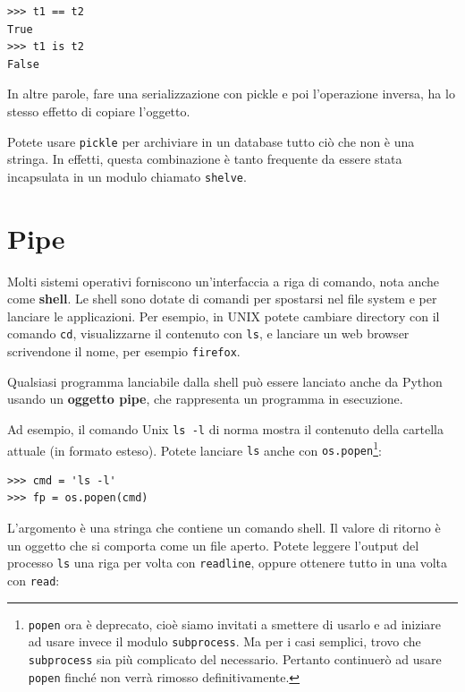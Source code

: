 \documentclass[10pt]{book}
\begin{document}
\begin{verbatim}
>>> t1 == t2
True
>>> t1 is t2
False
\end{verbatim}
%
In altre parole, fare una serializzazione con pickle e poi l'operazione inversa, ha lo stesso effetto di copiare l'oggetto.

Potete usare {\tt pickle} per archiviare in un database tutto ciò che non è una stringa. In effetti, questa combinazione è tanto frequente da essere stata incapsulata in un modulo chiamato {\tt shelve}.  


\section{Pipe}

Molti sistemi operativi forniscono un'interfaccia a riga di comando, nota anche come {\bf shell}.  Le shell sono dotate di comandi per spostarsi nel file system e per lanciare le applicazioni. Per esempio, in UNIX potete cambiare directory con il comando {\tt cd},
visualizzarne il contenuto con {\tt ls}, e lanciare un web browser scrivendone il nome, per esempio {\tt firefox}.

Qualsiasi programma lanciabile dalla shell può essere lanciato anche da Python usando un {\bf oggetto pipe}, che rappresenta un programma in esecuzione.

Ad esempio, il comando Unix {\tt ls -l} di norma mostra il contenuto della cartella attuale (in formato esteso). Potete lanciare {\tt ls} anche con {\tt os.popen}\footnote{{\tt popen} ora è deprecato, cioè siamo invitati a smettere di usarlo e ad iniziare ad usare invece il modulo {\tt subprocess}. Ma per i casi semplici, trovo che
{\tt subprocess} sia più complicato del necessario. Pertanto continuerò ad usare {\tt popen} finché non verrà rimosso definitivamente.}:

\begin{verbatim}
>>> cmd = 'ls -l'
>>> fp = os.popen(cmd)
\end{verbatim}
%
L'argomento è una stringa che contiene un comando shell. Il valore di ritorno è un oggetto che si comporta come un file aperto. Potete leggere l'output del processo {\tt ls} una riga per volta con {\tt readline}, oppure ottenere tutto in una volta con {\tt read}:
\end{document}
